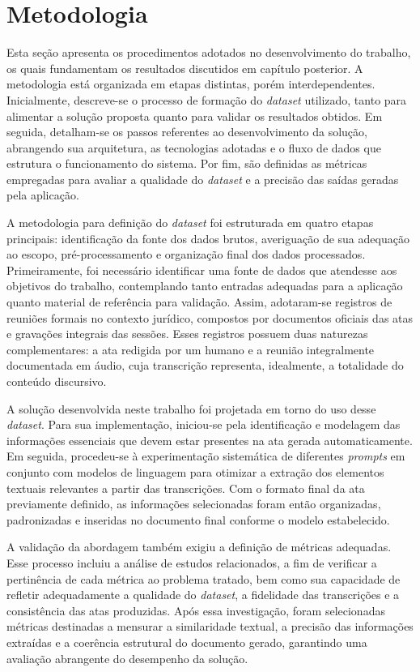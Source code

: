 \chapter{Metodologia}
\label{chap:metodologia}

Esta seção apresenta os procedimentos adotados no desenvolvimento do trabalho, os quais fundamentam os resultados discutidos em capítulo posterior. A metodologia está organizada em etapas distintas, porém interdependentes. Inicialmente, descreve-se o processo de formação do \textit{dataset} utilizado, tanto para alimentar a solução proposta quanto para validar os resultados obtidos. Em seguida, detalham-se os passos referentes ao desenvolvimento da solução, abrangendo sua arquitetura, as tecnologias adotadas e o fluxo de dados que estrutura o funcionamento do sistema. Por fim, são definidas as métricas empregadas para avaliar a qualidade do \textit{dataset} e a precisão das saídas geradas pela aplicação.

A metodologia para definição do \textit{dataset} foi estruturada em quatro etapas principais: identificação da fonte dos dados brutos, averiguação de sua adequação ao escopo, pré-processamento e organização final dos dados processados. Primeiramente, foi necessário identificar uma fonte de dados que atendesse aos objetivos do trabalho, contemplando tanto entradas adequadas para a aplicação quanto material de referência para validação. Assim, adotaram-se registros de reuniões formais no contexto jurídico, compostos por documentos oficiais das atas e gravações integrais das sessões. Esses registros possuem duas naturezas complementares: a ata redigida por um humano e a reunião integralmente documentada em áudio, cuja transcrição representa, idealmente, a totalidade do conteúdo discursivo.

A solução desenvolvida neste trabalho foi projetada em torno do uso desse \textit{dataset}. Para sua implementação, iniciou-se pela identificação e modelagem das informações essenciais que devem estar presentes na ata gerada automaticamente. Em seguida, procedeu-se à experimentação sistemática de diferentes \textit{prompts} em conjunto com modelos de linguagem para otimizar a extração dos elementos textuais relevantes a partir das transcrições. Com o formato final da ata previamente definido, as informações selecionadas foram então organizadas, padronizadas e inseridas no documento final conforme o modelo estabelecido.

A validação da abordagem também exigiu a definição de métricas adequadas. Esse processo incluiu a análise de estudos relacionados, a fim de verificar a pertinência de cada métrica ao problema tratado, bem como sua capacidade de refletir adequadamente a qualidade do \textit{dataset}, a fidelidade das transcrições e a consistência das atas produzidas. Após essa investigação, foram selecionadas métricas destinadas a mensurar a similaridade textual, a precisão das informações extraídas e a coerência estrutural do documento gerado, garantindo uma avaliação abrangente do desempenho da solução.

